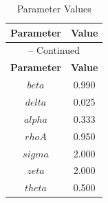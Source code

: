 \begin{center}
\begin{longtable}{cc}
\caption{Parameter Values}\\%
\toprule%
\multicolumn{1}{c}{\textbf{Parameter}} &
\multicolumn{1}{c}{\textbf{Value}}  \\%
\midrule%
\endfirsthead
\multicolumn{2}{c}{{\tablename} \thetable{} -- Continued}\\%
\midrule%
\multicolumn{1}{c}{\textbf{Parameter}} &
\multicolumn{1}{c}{\textbf{Value}} \\%
\midrule%
\endhead
$beta$ 	 & 	 0.990 \\
$delta$ 	 & 	 0.025 \\
$alpha$ 	 & 	 0.333 \\
$rhoA$ 	 & 	 0.950 \\
$sigma$ 	 & 	 2.000 \\
$zeta$ 	 & 	 2.000 \\
$theta$ 	 & 	 0.500 \\
\bottomrule%
\end{longtable}
\end{center}
